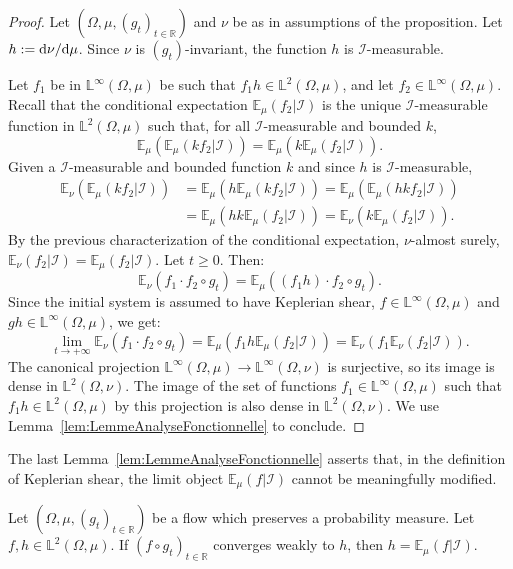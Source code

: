 \documentclass[10pt]{amsart}
\theoremstyle{definition}\newtheorem{defi}[theo]{Definition}\newtheorem{rema}[theo]{Remark}\newtheorem{exam}[theo]{Example}\newtheorem{exem}[theo]{Example}\newtheorem{nota}[theo]{Notation}
\newcommand{\R}{\mathbb{R}}
\newcommand{\Ebb}{\mathbb{E}}
\newcommand{\Lbb}{\mathbb{L}}
\newcommand{\Ical}{\mathcal{I}}
\newcommand{\de}{{\rm d}}
\begin{document}
\begin{proof}
Let $(\Omega, \mu, (g_t)_{t \in \R})$ and $\nu$ be as in assumptions of the proposition. Let $h := \de \nu / \de \mu$. Since $\nu$ is $(g_t)$-invariant, the function $h$ is $\Ical$-measurable.


Let $f_1$ be in $\Lbb^\infty (\Omega, \mu)$ be such that $f_1h \in \Lbb^2 (\Omega, \mu)$, and let $f_2 \in \Lbb^\infty (\Omega, \mu)$. Recall that the conditional expectation $\Ebb_\mu (f_2 | \Ical)$ is the unique $\Ical$-measurable function in $\Lbb^2 (\Omega, \mu)$ such that, for all $\Ical$-measurable and bounded $k$,
\[
\Ebb_\mu (\Ebb_\mu(k f_2 | \Ical)) = \Ebb_\mu (k \Ebb_\mu(f_2 | \Ical)).
\]
Given a $\Ical$-measurable and bounded function $k$ and since $h$ is $\Ical$-measurable,
\begin{align*}
\Ebb_\nu (\Ebb_\mu(k f_2 | \Ical)) & = \Ebb_\mu (h \Ebb_\mu(k f_2 | \Ical)) = \Ebb_\mu (\Ebb_\mu(hk f_2 | \Ical)) \\
& = \Ebb_\mu (hk \Ebb_\mu(f_2 | \Ical)) = \Ebb_\nu (k \Ebb_\mu(f_2 | \Ical)).
\end{align*}
By the previous characterization of the conditional expectation, $\nu$-almost surely, $\Ebb_\nu(f_2 | \Ical) = \Ebb_\mu(f_2 | \Ical)$. Let $t \geq 0$. Then:
\[
\Ebb_\nu (f_1 \cdot f_2 \circ g_t) = \Ebb_\mu ((f_1h) \cdot f_2\circ g_t).
\]
Since the initial system is assumed to have Keplerian shear, $f \in \Lbb^\infty (\Omega, \mu)$ and $gh \in \Lbb^\infty (\Omega, \mu)$, we get:
\[
\lim_{t \to + \infty} \Ebb_\nu (f_1 \cdot f_2 \circ g_t) = \Ebb_\mu (f_1h\Ebb_\mu (f_2 | \Ical)) = \Ebb_\nu (f_1 \Ebb_\nu (f_2 | \Ical)).
\]
The canonical projection $\Lbb^\infty (\Omega, \mu) \to \Lbb^\infty (\Omega, \nu)$ is surjective, so its image is dense in $\Lbb^2 (\Omega, \nu)$. The image of the set of functions $f_1 \in \Lbb^\infty (\Omega, \mu)$ such that $f_1h \in \Lbb^2 (\Omega, \mu)$ by this projection is also dense in $\Lbb^2 (\Omega, \nu)$. We use Lemma~\ref{lem:LemmeAnalyseFonctionnelle} to conclude.
\end{proof}


The last Lemma~\ref{lem:LemmeAnalyseFonctionnelle} asserts that, in the definition of Keplerian shear, the limit object $\Ebb_\mu (f | \Ical)$ cannot be meaningfully modified.


\begin{prop}
Let $(\Omega, \mu, (g_t)_{t \in \R})$ be a flow which preserves a probability measure. Let $f, h \in \Lbb^2 (\Omega, \mu)$.
If $(f \circ g_t)_{t \in \R}$ converges weakly to $h$, then $h = \Ebb_\mu (f | \Ical)$.
\end{prop}
\end{document}

